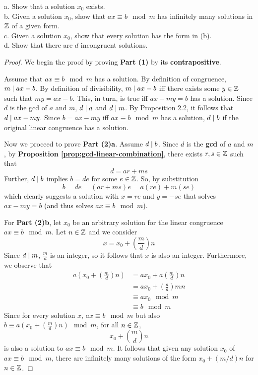 \begin{addmargin}[1em]{0em}
    a. Show that a solution $x_0$ exists. \\
    b. Given a solution $x_0$, show that $ax \equiv b \mod m$ has infinitely many solutions in $\mathbb{Z}$ of a given form. \\
    c. Given a solution $x_0$, show that every solution has the form in (b). \\
    d. Show that there are $d$ incongruent solutions.
\end{addmargin}

\begin{proof}
    We begin the proof by proving \textbf{Part (1)} by its \textbf{contrapositive}.
    
    Assume that $ax \equiv b \mod m$ has a solution. By definition of congruence, $m \mathrel{\mid} ax - b$. By definition of divisibility, $m \mathrel{\mid} ax - b$ iff there exists some $y \in \mathbb{Z}$ such that $my = ax-b$. This, in turn, is true iff $ax - my = b$ has a solution. Since $d$ is the gcd of $a$ and $m$, $d \mathrel{\mid} a$ and $d \mathrel{\mid} m$. By Proposition 2.2, it follows that $d \mathrel{\mid} ax - my$. Since $b = ax - my$ iff $ax \equiv b \mod m$ has a solution, $d \mathrel{\mid} b$ if the original linear congruence has a solution.

    Now we proceed to prove \textbf{Part (2)a}. Assume $d \mathrel{\mid} b$. Since $d$ is the \textbf{gcd} of $a$ and $m$, by \textbf{Proposition \ref{prop:gcd-linear-combination}}, there exists $r,s \in \mathbb{Z}$ such that
    $$
    d = ar + ms
    $$
    Further, $d \mathrel{\mid} b$ implies $b = de$ for some $e \in \mathbb{Z}$. So, by substitution
    $$
    b = de = (ar + ms)e = a(re) + m(se)
    $$
    which clearly suggests a solution with $x = re$ and $y = -se$ that solves $ax - my = b$ (and thus solves $ax \equiv b \mod m$).

    For \textbf{Part (2)b}, let $x_0$ be an arbitrary solution for the linear congruence $ax \equiv b \mod m$. Let $n \in \mathbb{Z}$ and we consider
    $$
    x = x_0 + \left( \frac{m}{d} \right) n
    $$
    Since $d \mathrel{\mid} m$, $\frac{m}{d}$ is an integer, so it follows that $x$ is also an integer. Furthermore, we observe that
    $$
    \begin{aligned}
        a\left( x_0 + \left( \frac{m}{d} \right) n \right) &= ax_0 + a\left( \frac{m}{d} \right) n \\
        &= ax_0 + \left( \frac{a}{d} \right) mn \\
        &\equiv ax_0 \mod m \\
        &\equiv b \mod m
    \end{aligned}
    $$
    Since for every solution $x$, $ax \equiv b \mod m$ but also $b \equiv a(x_0 + (\frac{m}{d})n) \mod m$, for all $n \in \mathbb{Z}$,
    $$
    x_0 + \left( \frac{m}{d} \right) n
    $$
    is also a solution to $ax \equiv b \mod m$. It follows that given any solution $x_0$ of $ax \equiv b \mod m$, there are infinitely many solutions of the form $x_0 + (m/d)n$ for $n \in \mathbb{Z}$.


\end{proof}
